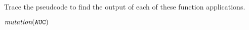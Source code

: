 
Trace the pseudcode to find the output of each of these function applications.

$\textit{mutation}(\texttt{A}\texttt{U}\texttt{C})$
